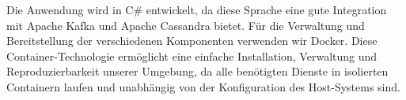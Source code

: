 Die Anwendung wird in C\# entwickelt, da diese Sprache eine gute Integration mit Apache Kafka und Apache Cassandra bietet. Für die Verwaltung und Bereitstellung der verschiedenen Komponenten verwenden wir Docker. Diese Container-Technologie ermöglicht eine einfache Installation, Verwaltung und Reproduzierbarkeit unserer Umgebung, da alle benötigten Dienste in isolierten Containern laufen und unabhängig von der Konfiguration des Host-Systems sind.
